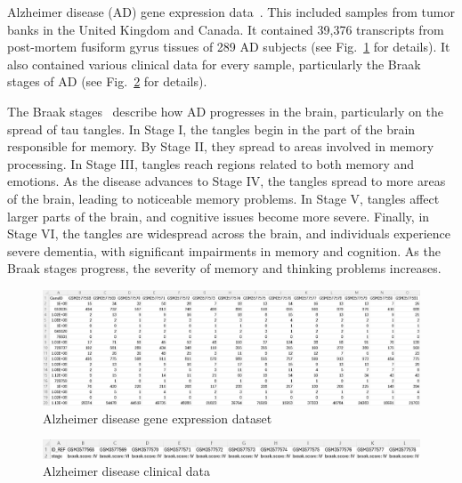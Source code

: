 \documentclass{statsoc}
\begin{document}
Alzheimer disease (AD) gene expression data~\citep{srinivasan2020alzheimer}. This included samples from tumor banks in the United Kingdom and Canada. It contained 39,376 transcripts from post-mortem fusiform gyrus tissues of 289 AD subjects (see Fig.~\ref{fig:alzheimer_expr} for details). It also contained various clinical data for every sample, particularly the Braak stages of AD (see Fig.~\ref{fig:alzheimer_data} for details).

The Braak stages~\citep{braak1991neuropathological} describe how AD progresses in the brain, particularly on the spread of tau tangles. In Stage I, the tangles begin in the part of the brain responsible for memory. By Stage II, they spread to areas involved in memory processing. In Stage III, tangles reach regions related to both memory and emotions. As the disease advances to Stage IV, the tangles spread to more areas of the brain, leading to noticeable memory problems. In Stage V, tangles affect larger parts of the brain, and cognitive issues become more severe. Finally, in Stage VI, the tangles are widespread across the brain, and individuals experience severe dementia, with significant impairments in memory and cognition. As the Braak stages progress, the severity of memory and thinking problems increases.

\begin{figure}[h!]
    \centering
    \includegraphics[width=\textwidth]{alzheimer_expr.png}
    \caption{Alzheimer disease gene expression dataset}
    \label{fig:alzheimer_expr}
\end{figure}

\begin{figure}[h!]
    \centering
    \includegraphics[width=\textwidth]{alzheimer_data.png}
    \caption{Alzheimer disease clinical data}
    \label{fig:alzheimer_data}
\end{figure}
\end{document}

